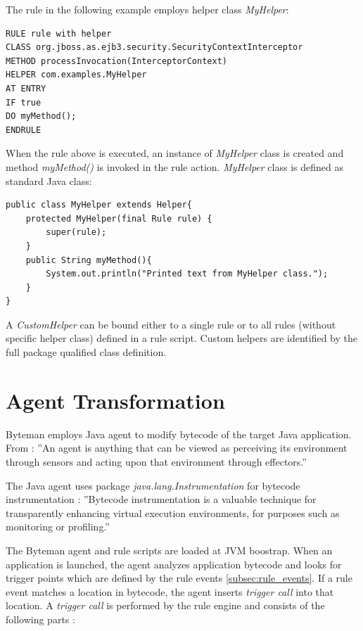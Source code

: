 \documentclass[12pt,oneside]{fithesis2}
\begin{document}
The rule in the following example employs helper class \textit{MyHelper}:
\begin{lstlisting}[caption = Rule with user-defined helper class, label = rule_with_helper, style=byteman]
RULE rule with helper
CLASS org.jboss.as.ejb3.security.SecurityContextInterceptor
METHOD processInvocation(InterceptorContext)
HELPER com.examples.MyHelper
AT ENTRY
IF true
DO myMethod();
ENDRULE
\end{lstlisting}

When the rule above is executed, an instance of \textit{MyHelper} class is created and method \textit{myMethod()} is invoked in the rule action. \textit{MyHelper} class is defined as standard Java class:
\begin{lstlisting}[caption = User-Defined helper class, label = rule_helper, style=eclipse_java]
public class MyHelper extends Helper{
	protected MyHelper(final Rule rule) {
		super(rule);
	}
	public String myMethod(){
		System.out.println("Printed text from MyHelper class.");
	}
}
\end{lstlisting}

A \textit{CustomHelper} can be bound either to a single rule or to all rules (without specific helper class) defined in a rule script. Custom helpers are identified by the full package qualified class definition.

\section{Agent Transformation}
Byteman employs Java agent to modify bytecode of the target Java application. From \cite{agent_def}: ''An agent is anything that can be viewed as perceiving its environment through sensors and acting upon that environment through effectors.''

The Java agent uses package \textit{java.lang.Instrumentation} for bytecode instrumentation \cite{instrumentation}: ''Bytecode instrumentation is a valuable technique for transparently enhancing virtual execution environments, for purposes such as monitoring or profiling.''

The Byteman agent and rule scripts are loaded at JVM boostrap. When an application is launched, the agent analyzes application bytecode and looks for trigger points which are defined by the rule events \ref{subsec:rule_events}. If a rule event matches a location in bytecode, the agent inserts \textit{trigger call} into that location. A \textit{trigger call} is performed by the rule engine and consists of the following parts \cite[Agent Transformation]{byteman_doc}:
\end{document}
